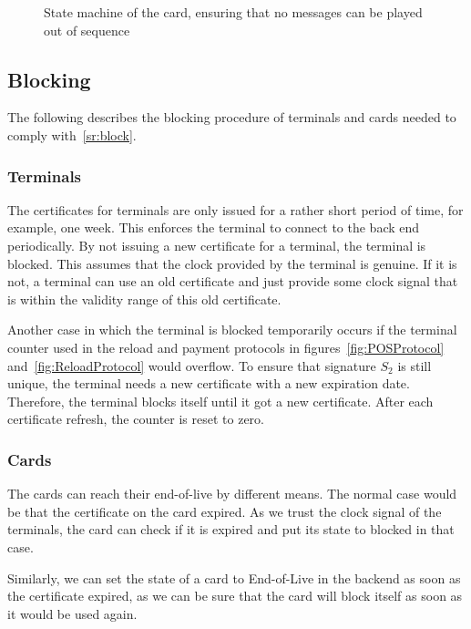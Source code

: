 \documentclass{article}
\begin{document}
\begin{figure}
    \centering
    
    \caption{State machine of the card, ensuring that no messages can be played out of sequence}
    \label{fig:stateMachine}
\end{figure}

\subsection{Blocking} \label{sec:blocking}
The following describes the blocking procedure of terminals and cards needed to comply with~\ref{sr:block}.

\subsubsection{Terminals} \label{sec:blockTerminal}
The certificates for terminals are only issued for a rather short period of time, for example, one week.
This enforces the terminal to connect to the back end periodically.
By not issuing a new certificate for a terminal, the terminal is blocked.
This assumes that the clock provided by the terminal is genuine.
If it is not, a terminal can use an old certificate and just provide some clock signal that is within the validity range of this old certificate.

Another case in which the terminal is blocked temporarily occurs if the terminal counter used in the reload and payment protocols in figures~\ref{fig:POSProtocol} and~\ref{fig:ReloadProtocol} would overflow.
To ensure that signature $S_2$ is still unique, the terminal needs a new certificate with a new expiration date.
Therefore, the terminal blocks itself until it got a new certificate.
After each certificate refresh, the counter is reset to zero.

\subsubsection{Cards} \label{sec:blockCards}
The cards can reach their end-of-live by different means.
The normal case would be that the certificate on the card expired.
As we trust the clock signal of the terminals, the card can check if it is expired and put its state to blocked in that case.

Similarly, we can set the state of a card to End-of-Live in the backend as soon as the certificate expired, as we can be sure that the card will block itself as soon as it would be used again.
\end{document}
